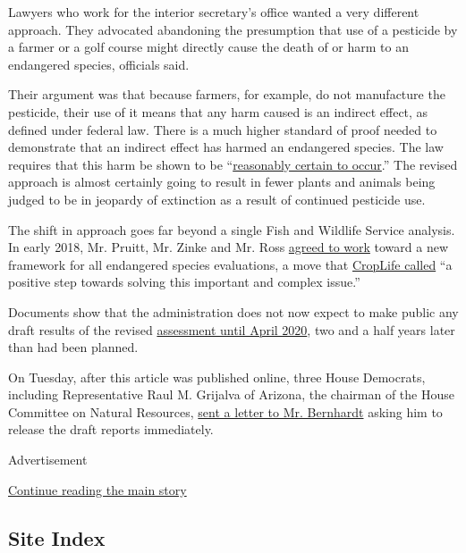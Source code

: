 Lawyers who work for the interior secretary's office wanted a very
different approach. They advocated abandoning the presumption that use
of a pesticide by a farmer or a golf course might directly cause the
death of or harm to an endangered species, officials said.

Their argument was that because farmers, for example, do not manufacture
the pesticide, their use of it means that any harm caused is an indirect
effect, as defined under federal law. There is a much higher standard of
proof needed to demonstrate that an indirect effect has harmed an
endangered species. The law requires that this harm be shown to be
``\href{https://www.fws.gov/midwest/endangered/section7/s7process/s7glossary.html}{reasonably
certain to occur}.'' The revised approach is almost certainly going to
result in fewer plants and animals being judged to be in jeopardy of
extinction as a result of continued pesticide use.

The shift in approach goes far beyond a single Fish and Wildlife Service
analysis. In early 2018, Mr. Pruitt, Mr. Zinke and Mr. Ross
\href{https://www.documentcloud.org/documents/5778894-Trump-Era-Shift-Evaluating-Pesticide-Threats-to.html\#document/p125/a488281}{agreed
to work} toward a new framework for all endangered species evaluations,
a move that
\href{https://www.documentcloud.org/documents/5778894-Trump-Era-Shift-Evaluating-Pesticide-Threats-to.html\#document/p133/a488285}{CropLife
called} ``a positive step towards solving this important and complex
issue.''

Documents show that the administration does not now expect to make
public any draft results of the revised
\href{https://www.documentcloud.org/documents/5778894-Trump-Era-Shift-Evaluating-Pesticide-Threats-to.html\#document/p161/a488286}{assessment
until April 2020}, two and a half years later than had been planned.

On Tuesday, after this article was published online, three House
Democrats, including Representative Raul M. Grijalva of Arizona, the
chairman of the House Committee on Natural Resources,
\href{https://www.documentcloud.org/documents/5778894-Trump-Era-Shift-Evaluating-Pesticide-Threats-to.html\#document/p163/a489246}{sent
a letter to Mr. Bernhardt} asking him to release the draft reports
immediately.

Advertisement

\protect\hyperlink{after-bottom}{Continue reading the main story}

\hypertarget{site-index}{%
\subsection{Site Index}\label{site-index}}

